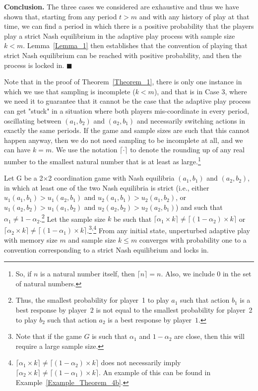 {\bf Conclusion.} The three cases we considered are exhaustive and thus we have shown that, starting  from any period $t>m$ and with any history of play at that time, we can find a period in which there is a positive probability that the players play a strict Nash equilibrium in the adaptive play process with sample size $k<m$. Lemma~\ref{Lemma_1} then establishes that the convention of playing that strict Nash equilibrium can be reached with positive probability, and then the process is locked in.
$\blacksquare$

\medskip
Note that in the proof of Theorem~\ref{Theorem_1}, there is only one instance in which we use that sampling is incomplete ($k<m$), and that is in Case 3, where we need it to guarantee that it cannot be the case that the adaptive play process can get "stuck" in a situation where both players mis-coordinate in every period, oscillating between $(a_1,b_2)$ and $(a_2,b_1)$ and necessarily switching actions in exactly the same periods. 
%
If the game and sample sizes are such that this cannot happen anyway, then we do not need sampling to be incomplete at all, and we can have $k=m$. 
We use the notation $\lceil\cdot\rceil$ to denote the rounding up of any real number to the smallest natural number that is at least as large.\footnote{So, if $n$ is a natural number itself, then $\lceil n\rceil=n$. Also, we include $0$ in the set of natural numbers.}

\begin{theorem}\label{Theorem_2}
Let G be a 2$\times$2 coordination game with Nash equilibria $(a_1,b_1)$ and $(a_2,b_2)$,  
in which at least one of the two Nash equilibria is strict (i.e., either $u_1(a_1,b_1) > u_1(a_2,b_1)$ and $u_2(a_1,b_1) > u_2(a_1,b_2)$, or $u_1(a_2,b_2) > u_1(a_1,b_2)$ and $u_2(a_2,b_2) > u_2(a_2,b_1)$)  
%
and such that $\alpha_1\neq 1-\alpha_2$.\footnote{Thus, the smallest probability for player~1 to play $a_1$ such that action $b_1$ is a best response by player~$2$ is not equal to the smallest probability for player~2 to play $b_2$ such that action $a_2$ is a best response by player~$1$.} 
%
Let the sample size $k$ be such that $\lceil\alpha_1\times k\rceil \neq \lceil (1-\alpha_2)\times k\rceil$ or $\lceil\alpha_2\times k\rceil \neq \lceil (1-\alpha_1)\times k\rceil$.\footnote{Note that if the game $G$ is such that $\alpha_1$ and $1-\alpha_2$ are close, then this will require a large sample size.}\textsuperscript{,}\footnote{$\lceil\alpha_1\times k\rceil \neq \lceil (1-\alpha_2)\times k\rceil$ does not necessarily imply $\lceil\alpha_2\times k\rceil \neq \lceil (1-\alpha_1)\times k\rceil$. An example of this can be found in Example~\ref{Example_Theorem_4b}.}
From any initial state, unperturbed adaptive play with memory size $m$ and sample size $k \leq m$ converges with probability one to a convention corresponding to a strict Nash equilibrium and locks in.
\end{theorem}

